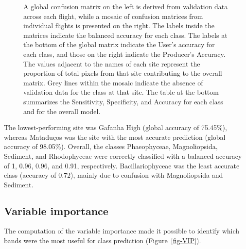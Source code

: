 \documentclass[
  letterpaper,
  11pt,
  english,
  singlespacing,
  headsepline]{MastersDoctoralThesis}
\begin{document}
\begin{spacing}{1.5}
\begin{figure}
{}

\caption{\label{fig-Validation}A global confusion matrix on the left is
derived from validation data across each flight, while a mosaic of
confusion matrices from individual flights is presented on the right.
The labels inside the matrices indicate the balanced accuracy for each
class. The labels at the bottom of the global matrix indicate the User's
accuracy for each class, and those on the right indicate the Producer's
Accuracy. The values adjacent to the names of each site represent the
proportion of total pixels from that site contributing to the overall
matrix. Grey lines within the mosaic indicate the absence of validation
data for the class at that site. The table at the bottom summarizes the
Sensitivity, Specificity, and Accuracy for each class and for the
overall model.}

\end{figure}%

The lowest-performing site was Gafanha High (global accuracy of
75.45\%), whereas Mataduços was the site with the most accurate
prediction (global accuracy of 98.05\%). Overall, the classes
Phaeophyceae, Magnoliopsida, Sediment, and Rhodophyceae were correctly
classified with a balanced accuracy of 1, 0.96, 0.96, and 0.91,
respectively. Bacillariophyceae was the least accurate class (accuracy
of 0.72), mainly due to confusion with Magnoliopsida and Sediment.

\subsection{Variable importance}\label{variable-importance-1}

The computation of the variable importance made it possible to identify
which bands were the most useful for class prediction
(Figure~\ref{fig-VIP}).

\begin{figure}

\end{figure}
\end{spacing}
\end{document}
